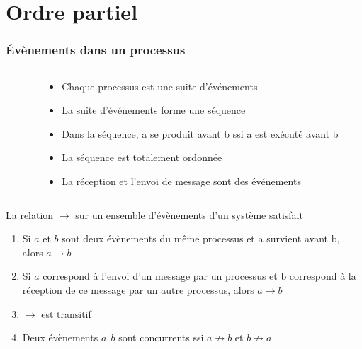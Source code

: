 \documentclass[compress]{beamer}
\begin{document}
\section{Ordre partiel}

\begin{frame}
\frametitle{\'Evènements dans un processus}
\begin{columns}
    \begin{column}{0.2\textwidth}
    \end{column}
  
    \begin{column}{0.8 \textwidth}
    \begin{itemize}
    \item Chaque processus est une suite d'événements
    \item La suite d'événements forme une séquence
    \item Dans la séquence, a se produit avant b ssi a est exécuté avant b
    \item La séquence est totalement ordonnée
    \item La réception et l'envoi de message sont des événements
    \end{itemize}
    \end{column}
\end{columns}
\end{frame}


\begin{frame}
\begin{definition}
La relation $\rightarrow$ sur un ensemble d'évènements d'un système satisfait
\begin{enumerate}
\item Si $a$ et $b$ sont deux évènements du même processus et a survient avant b, alors $a \rightarrow b$
\item Si $a$ correspond à l'envoi d'un message par un processus et b correspond à la réception de ce message par un autre processus, alors $a \rightarrow b$
\item $\rightarrow$ est transitif
\item Deux évènements $a, b$ sont concurrents ssi $a \not\rightarrow b$ et $b \not\rightarrow a$
\end{enumerate}
\end{definition}
\end{frame}
\end{document}
